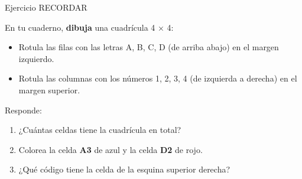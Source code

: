 \documentclass[aspectratio=169, 10pt, spanish]{beamer}
\begin{document}

\begin{frame}{Ejercicio RECORDAR}
  \quad{}
  \vspace{4pt}
  \begin{recordarbox}
    \AlmFontSmall
    En tu cuaderno, \textbf{dibuja} una cuadrícula 4 × 4:
    \begin{itemize}
      \item Rotula las filas con las letras A, B, C, D
            (de arriba abajo) en el margen izquierdo.
      \item Rotula las columnas con los números 1, 2, 3, 4
            (de izquierda a derecha) en el margen superior.
    \end{itemize}
    \vspace{4pt}
    Responde:
    \begin{enumerate}
      \item ¿Cuántas celdas tiene la cuadrícula en total?
      \item Colorea la celda \textbf{A3} de azul
            y la celda \textbf{D2} de rojo.
      \item ¿Qué código tiene la celda de la esquina
            superior derecha?
    \end{enumerate}
  \end{recordarbox}
\end{frame}
\end{document}
